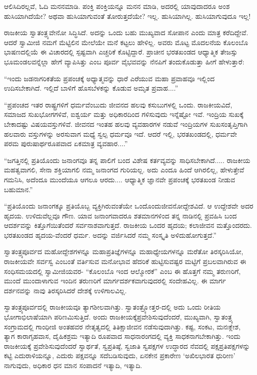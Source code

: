 ಆಲಿಸಿದಿರಲ್ಲವೆ, ಓದಿ ಮನನಮಾಡಿ. ಪಂಕ್ತಿ ಪಂಕ್ತಿಯನ್ನೂ ಮನನ ಮಾಡಿ, ಅದರಲ್ಲಿ ಯಾವುದಾದರೂ ಅಂಶ ಹುಸಿಯಾಗಿದೆಯೇ? ಅಥವಾ ಹುಸಿಯಾಗುವಂತೆ ತೋರುತ್ತದೆಯೇ? ಇಲ್ಲ. ಹುಸಿಯಾಗಿಲ್ಲ. ಹುಸಿಯಾಗುವುದೂ ಇಲ್ಲ!

ರಾಜಕೀಯ ಸ್ವಾತಂತ್ರ್ಯವೇನೋ ಸಿದ್ಧಿಸಿದೆ. ಅದನ್ನು ಒಂದು ಬಹು ಮುಖ್ಯವಾದ ಸೋಪಾನ ಎಂದು ಮಾತ್ರ ಕರೆದಿದ್ದೇವೆ. ಆದರೆ ಸ್ವಾಮೀಜಿ ನಮಗೆ ಮೆಟ್ಟಿಲಿನ ಮೇಲೆಯೇ ಮನೆ ಕಟ್ಟಲು ಹೇಳಿಲ್ಲ. ಅವರು ಮೊಟ್ಟ ಮೊದಲನೆಯ ಕೊಲಂಬೊ ಭಾಷಣದಲ್ಲಿಯೆ ಈ ವಿಚಾರದಲ್ಲಿ ಸ್ಪಷ್ಟವಾಗಿ ಎಚ್ಚರಿಕೆ ಕೊಟ್ಟಿದ್ದಾರೆ. ಪ್ರಾಚೀನ ಭರತಖಂಡದ ಆಧ್ಯಾತ್ಮಿಕ ತೇಜಸ್ಸು ಭೂಮಂಡಲವನ್ನೆಲ್ಲಾ ಹೇಗೆ ವ್ಯಾಪಿಸಿತ್ತು ಎಂಬ ಪೂರ್ವ ವೈಭವವನ್ನು ನೆನಪಿಗೆ ತಂದುಕೊಡುತ್ತಾ ಹೀಗೆ ಹೇಳುತ್ತಾರೆ:

“ಇಂದು ಜಡನಾಗರಿಕತೆಯ ಪ್ರಪಂಚಕ್ಕೆ ಅಧ್ಯಾತ್ಮವನ್ನು ಧಾರೆ ಎರೆಯುವ ಮಹಾ ಪ್ರವಾಹವೂ ಇಲ್ಲಿಂದ ಉದಿಸಬೇಕಾಗಿದೆ. ಇಲ್ಲಿದೆ ಬಾಳಿಗೆ ಹೊಸಬೆಳಕನ್ನು ಕೊಡುವ ಅಮೃತ ಪ್ರವಾಹ....”

“ಪ್ರಪಂಚದ ಇತರ ರಾಷ್ಟ್ರಗಳಿಗೆ ಧರ್ಮವೆಂಬುದು ಜೀವನದ ಹಲವು ಕಸುಬುಗಳಲ್ಲಿ ಒಂದು. ರಾಜಕೀಯವಿದೆ, ಸಮಾಜದ ಸುಖಭೋಗಗಳಿವೆ, ಐಶ್ವರ್ಯ ಮತ್ತು ಅಧಿಕಾರದಿಂದ ಗಳಿಸುವುದು ಇನ್ನೆಷ್ಟೋ ಇವೆ. ಇಂದ್ರಿಯ ಸುಖಕ್ಕೆ ಬೇಕಾದಷ್ಟು ವಿಷಯವಸ್ತುಗಳಿವೆ. ಜೀವನದ ಇಂತಹ ಹಲವು ವ್ಯವಹಾರಗಳ ನಡುವೆ ಇಂದ್ರಿಯಗಳ ಸುಖಸಂತೃಪ್ತಿಗಾಗಿ ಹಲವಾರು ವಸ್ತುಗಳನ್ನು ಅರಸುವಾಗ ಮಧ್ಯೆ ಸ್ವಲ್ಪ ಧರ್ಮವೂ ಇದೆ. ಆದರೆ ಇಲ್ಲಿ, ಭರತಖಂಡದಲ್ಲಿ, ಧರ್ಮವೇ ಪರಮ ಪುರುಷಾರ್ಥರೂಪವಾದ ಏಕಮಾತ್ರ ವ್ಯವಹಾರ....”

“ಜಗತ್ತಿನಲ್ಲಿ ಪ್ರತಿಯೊಂದು ಜನಾಂಗವೂ ತನ್ನ ಪಾಲಿಗೆ ಬಂದ ವಿಶೇಷ ಕರ್ತವ್ಯವನ್ನು ಸಾಧಿಸಬೇಕಾಗಿದೆ..... ರಾಜಕೀಯ ಮಹತ್ವವಾಗಲಿ, ಸೇನಾ ಶಕ್ತಿಯಾಗಲಿ ನಮ್ಮ ಜನಾಂಗದ ಗುರಿಯಲ್ಲ. ಅದು ಎಂದೂ ಹಿಂದೆ ಆಗಿರಲಿಲ್ಲ, ಹೇಳುತ್ತೇವೆ ಗಮನಿಸಿ, ಅದೆಂದೂ ಮುಂದೆಯೂ ಆಗಲೂ ಆರದು.... ಆಧ್ಯಾತ್ಮಿಕ ಜ್ಞಾನವೇ ಪ್ರಪಂಚಕ್ಕೆ ಭರತಖಂಡ ನೀಡುವ ಬಹುಮಾನ.”

“ಪ್ರತಿಯೊಂದು ಜನಾಂಗಕ್ಕೂ ಪ್ರತಿಯೊಬ್ಬ ವ್ಯಕ್ತಿಗಿರುವಂತೆಯೇ ಒಂದೊಂದು\break ಜೀವನೋದ್ದೇಶವಿದೆ. ಆ ಉದ್ದೇಶವೇ ಅದರ ಹೃದಯ. ಉಳಿದುವೆಲ್ಲವೂ ಗೌಣ. ಯಾವ ಜನಾಂಗವಾದರೂ ಶತಮಾನಗಳಿಂದ ತನ್ನ ನಾಡಿನಲ್ಲಿ ಪ್ರವಹಿಸಿ ಬಂದ ಆದರ್ಶವನ್ನು ಕಿತ್ತೊಗೆಯಿತೆಂದರೆ ಸರ್ವನಾಶವಾಗುತ್ತದೆ. ರಾಜಕೀಯ ಒಂದರ ಹೃದಯ; ಕಲಾಜೀವನ ಮತ್ತೊಂದರದು. ಭರತಖಂಡದ ಹೃದಯ-ವೆಂದರೆ ಧರ್ಮ. ಅದನ್ನು ವರ್ಜಿಸಿದರೆ ನಮ್ಮ ಸಂಸ್ಕೃತಿ ಅಳಿದುಹೋಗುತ್ತದೆ.”

ಸ್ವಾತಂತ್ರ್ಯಪೂರ್ವದ ಮಹೋದ್ದೇಶಗಳನ್ನೂ ಮಹಾಪ್ರತಿಜ್ಞೆಗಳನ್ನೂ ಮಹಾಧ್ಯೇಯಗಳನ್ನೂ ಮರೆತೋ ತಿರಸ್ಕರಿಸಿಯೋ, ರಾಜಕೀಯವೇ ಸರ್ವಸ್ವ ಎಂಬಂತೆ ವರ್ತಿಸುವ ಮನೋಭಾವ ಹೆದರಿಕೆ ಹುಟ್ಟಿಸುವಷ್ಟರ ಮಟ್ಟಿಗೆ ಪ್ರಬಲವಾಗಿರುವ ಈ ಸಂಧಿಸಮಯದಲ್ಲಿ ಸ್ವಾಮೀಜಿಯವರ- “ಕೊಲಂಬೊ ಇಂದ ಆಲ್ಮೋರಕೆ” ಎಂಬ ಈ ಹೊತ್ತಗೆ ನಮ್ಮ ತರುಣರಿಗೆ, ಮುಂದೆ ಮುಂದಾಳಾಗುವ ಇಂದಿನ ತರುಣರಿಗೆ ಮಾರ್ಗದರ್ಶಕವಾಗುವುದರಲ್ಲಿ ಸಂದೇಹವಿಲ್ಲ. ಈ ಮಾರ್ಗ ದರ್ಶನವನ್ನು ನಾವು ತಿರಸ್ಕರಿಸಿದರೆ ದೇಶಕ್ಕೆ ಉಳಿಗಾಲವಿಲ್ಲ.

ಸ್ವಾತಂತ್ರ್ಯಪೂರ್ವದಲ್ಲಿ ರಾಜಕೀಯವೂ ತ್ಯಾಗಶೀಲವಾಗಿತ್ತು. ಸ್ವಾತಂತ್ರ್ಯೋತ್ತರ-ದಲ್ಲಿ ಅದು ಒಂದು ರೀತಿಯ ಭೋಗಾಭಿಲಾಷೆಯಾಗಿ ಪರಿಣಮಿಸುತ್ತಿದೆ. ಅಂದು ರಾಜಕೀಯಕ್ಕೆ\break ಪ್ರವೇಶಿಸುವುದೆಂದರೆ, ಮುಖ್ಯವಾಗಿ, ಸ್ವಾತಂತ್ರ್ಯ ಸಂಗ್ರಾಮದಲ್ಲಿ ಗಾಂಧೀಜಿ ಅಂತಹವರ ನೇತೃತ್ವದಲ್ಲಿ ತಿತಿಕ್ಷಾಜೀವನ ನಡೆಸುವುದಾಗಿತ್ತು. ಕಷ್ಟ, ಸಂಕಟ, ಮನಃಕ್ಲೇಶ, ತ್ಯಾಗ ಕಾರಾಗೃಹವಾಸ, ದೈಹಿಕಶ್ರಮ ಇತ್ಯಾದಿ ರೂಪವಾದ ಸಾಧನಾರಂಗದಲ್ಲಿ ವ್ಯಕ್ತಿ ಸಾಧಕನಾಗಬೇಕಾಗಿತ್ತು. ಇಂದು ರಾಜಕೀಯಕ್ಕೆ ಪ್ರವೇಶಿಸುವುದೆಂದರೆ ಸ್ವಾರ್ಥತೆ, ಸ್ವಪ್ರತಿಷ್ಠೆ, ಸ್ವಜಾತಿ ಸ್ವಪಕ್ಷಗಳ ಉದ್ಧಾರದ ನೆವದಲ್ಲಿ ಪಕ್ಷಪ್ರತಿಪಕ್ಷಗಳನ್ನು ಕಟ್ಟಿ ಎದುರಾಳಿಯನ್ನೂ, ಎದುರು ಪಕ್ಷವನ್ನೂ ಸದೆಬಡಿಸುವುದು, ಏನಕೇನ ಪ್ರಕಾರೇಣ ‘ಅಖಿಲಭಾರತ ಧುರೀಣ’ ನಾಗು\-ವುದು, ಅಧಿಕಾರ ಧನ ಮಾನ ಸಂಪಾದನೆ ಇತ್ಯಾದಿ, ಇತ್ಯಾದಿ.

